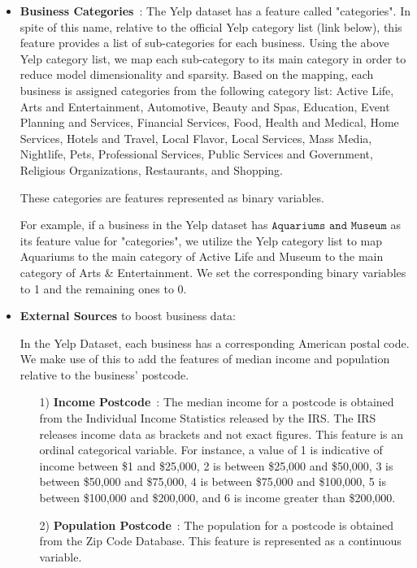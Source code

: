 \documentclass{article}
\begin{document}
\begin{itemize}[leftmargin=*]
\item \textbf{Business Categories}~\cite{categories}: The Yelp dataset has a feature called "categories". In spite of this name, relative to the official Yelp category list (link below), this feature provides a list of sub-categories for each business. Using the above Yelp category list, we map each sub-category to its main category in order to reduce model dimensionality and sparsity. Based on the mapping, each business is assigned categories from the following category list: Active Life, Arts and Entertainment, Automotive, Beauty and Spas, Education, Event Planning and Services, Financial Services, Food, Health and Medical, Home Services, Hotels and Travel, Local Flavor, Local Services, Mass Media, Nightlife, Pets, Professional Services, Public Services and Government, Religious Organizations, Restaurants, and Shopping. 

These categories are features represented as binary variables. 

For example, if a business in the Yelp dataset has $\texttt{Aquariums and Museum}$ as its feature value for "categories", we utilize the Yelp category list to map Aquariums to the main category of Active Life and Museum to the main category of Arts \& Entertainment. We set the corresponding binary variables to 1 and the remaining ones to 0. 




\item  \textbf{External Sources} to boost business data:

In the Yelp Dataset, each business has a corresponding American postal code. We make use of this to add the features of median income and population relative to the business' postcode.

\begin{itemize}
    \item [1)] \textbf{Income Postcode}~\cite{income}: The median income for a postcode is obtained from the Individual Income Statistics released by the IRS. The IRS releases income data as brackets and not exact figures. This feature is an ordinal categorical variable. For instance, a value of 1 is indicative of income between \$1 and \$25,000, 2 is between \$25,000 and \$50,000, 3 is between \$50,000 and \$75,000, 4 is between \$75,000 and \$100,000, 5 is between \$100,000 and \$200,000, and 6 is income greater than \$200,000.
    \item  [2)] \textbf{Population Postcode}~\cite{zip}: The population for a postcode is obtained from the Zip Code Database. This feature is represented as a continuous variable.
\end{itemize}


\end{itemize}
\end{document}
